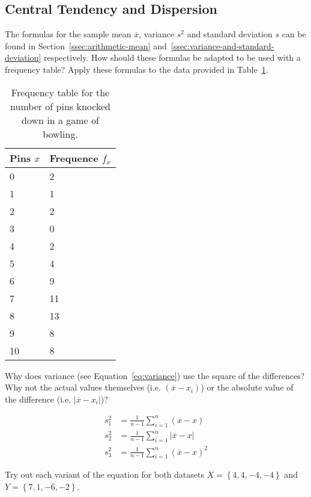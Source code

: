 \subsection{Central Tendency and Dispersion}

\begin{exercise}
  \label{ex:mean-stdev-freq}
  The formulas for the sample mean $\overline{x}$, variance $s^2$ and standard deviation $s$ can be found in Section~\ref{ssec:arithmetic-mean} and~\ref{ssec:variance-and-standard-deviation} respectively.
  How should these formulas  be adapted to be used with a frequency table? Apply these formulas to the data provided in Table~\ref{tab:pinfreq}.
\end{exercise}

\begin{table}
  \centering
  \begin{tabular}{@{}ll@{}}
    \toprule
    Pins $x$ & Frequence $f_{x}$ \\ 
    \midrule
        0      &         2          \\
        1      &         1          \\
        2      &         2          \\
        3      &         0          \\
        4      &         2          \\
        5      &         4          \\
        6      &         9          \\
        7      &         11         \\
        8      &         13         \\
        9      &         8          \\
        10     &         8          \\
    \bottomrule
  \end{tabular}
  \caption{Frequency table for the number of pins knocked down in a game of bowling.}
  \label{tab:pinfreq}
\end{table}

\begin{exercise}
  \label{ex:variance-formula}
  Why does variance (see Equation~\ref{eq:variance}) use the square of the differences? Why not the actual values themselves (i.e. $(\overline{x} - x_i)$) or the absolute value of the difference (i.e. $\left|\overline{x} - x_i\right|$)?
  
  \begin{align}
  s^{2}_{1} &= \frac{1}{n-1} \sum_{i=1}^{n} (\overline{x} - x) \\
  s^{2}_{2} &= \frac{1}{n-1} \sum_{i=1}^{n} \left| \overline{x} - x\right| \\
  s^{2}_{3} &= \frac{1}{n-1} \sum_{i=1}^{n} (\overline{x} - x)^{2}
  \end{align}
  
  Try out each variant of the equation for both datasets $X = \left\{4,4,-4,-4\right\}$ and $Y = \left\{7,1,-6,-2\right\}$.
\end{exercise}

